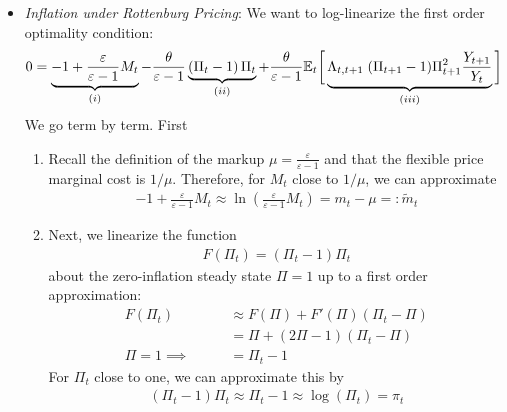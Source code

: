 \documentclass[12pt]{article}
\theoremstyle{plain}
\theoremstyle{definition}
\theoremstyle{remark}
\newcommand{\E}{\mathbb{E}}
\begin{document}
\begin{itemize}
  \item
    \emph{Inflation under Rottenburg Pricing}:
    We want to log-linearize the first order optimality condition:
    \begin{align*}
      0 &=
      \underbrace{%
      -1 + \frac{\varepsilon}{\varepsilon-1} M_t
      }_{(i)}
      -
      \frac{\theta}{\varepsilon-1}
      \underbrace{%
      \left(
      \Pi_t-1
      \right)
      \Pi_t
      }_{(ii)}
      +
      \frac{\theta}{\varepsilon-1}
      \E_t\bigg[
      \underbrace{%
        \Lambda_{t,t+1}\;
        (\Pi_{t+1}-1)\Pi^2_{t+1}\frac{Y_{t+1}}{Y_t}
      }_{(iii)}
      \bigg]
    \end{align*}
    We go term by term. First
    \begin{enumerate}[label=(\roman*)]
      \item Recall the definition of the markup
        $\mu=\frac{\varepsilon}{\varepsilon-1}$ and that the flexible
        price marginal cost is $1/\mu$. Therefore, for $M_t$ close to
        $1/\mu$, we can approximate
        \begin{align*}
          -1 + \frac{\varepsilon}{\varepsilon-1} M_t
          \approx \ln\left(\frac{\varepsilon}{\varepsilon-1} M_t\right)
          = m_t - \mu =: \tilde{m}_t
        \end{align*}

      \item Next, we linearize the function
        \begin{align*}
          F(\Pi_t) = (\Pi_t-1)\Pi_t
        \end{align*}
        about the zero-inflation steady state $\Pi=1$ up to a first
        order approximation:
        \begin{align*}
          F(\Pi_t)
          &\approx F(\Pi) + F'(\Pi)(\Pi_t-\Pi)
          \\
          &= \Pi + (2\Pi-1)(\Pi_t-\Pi)
          \\
          \text{$\Pi=1$}\implies\qquad
          &= \Pi_t-1
        \end{align*}
        For $\Pi_t$ close to one, we can approximate this by
        \begin{align*}
          (\Pi_t-1)\Pi_t
          \approx \Pi_t-1 \approx \log(\Pi_t) = \pi_t
        \end{align*}


\end{enumerate}
\end{itemize}
\end{document}

